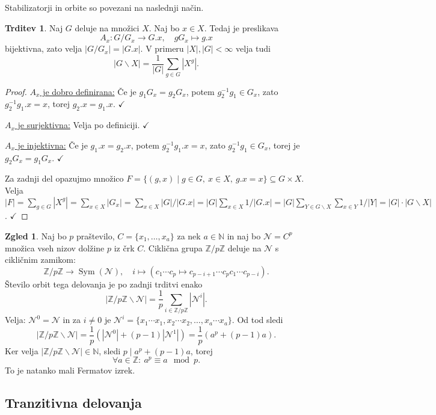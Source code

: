 \documentclass[11pt]{book}
\def\NN{\mathbb{N}}
\def\ZZ{\mathbb{Z}}
\DeclareMathOperator\Sym{Sym}
\def\kljuka{$\checkmark$}
\theoremstyle{definition}
\theoremstyle{zgled}
\newtheorem*{zgled}{Zgled}
\theoremstyle{odprtproblem}
\theoremstyle{domacanaloga}
\newenvironment{dokaz}
    {\color{siva}\begin{proof}}
    {\end{proof}}
\theoremstyle{izrek}
\newtheorem*{trditev}{Trditev}
\begin{document}
Stabilizatorji in orbite so povezani na naslednji način.

\begin{trditev}
Naj $G$ deluje na množici $X$. Naj bo $x \in X$. Tedaj je preslikava
\[
A_x \colon G/G_x \to G.x, \quad g G_x \mapsto g.x
\]
bijektivna, zato velja $|G/G_x| = |G.x|$. V primeru $|X|, |G| < \infty$ velja tudi
\[
|G \backslash X| = \frac{1}{|G|} \sum_{g \in G} |X^g|.
\]
\end{trditev}

\begin{dokaz}
\underline{$A_x$ je dobro definirana:} Če je $g_1 G_x = g_2 G_x$, potem $g_2^{-1} g_1 \in G_x$, zato $g_2^{-1} g_1 .x = x$, torej $g_2.x = g_1.x$. \kljuka

\underline{$A_x$ je surjektivna:} Velja po definiciji. \kljuka

\underline{$A_x$ je injektivna:} Če je $g_1.x = g_2.x$, potem $g_2^{-1}g_1.x=x$, zato $g_2^{-1}g_1 \in G_x$, torej je $g_2G_x = g_1G_x$. \kljuka

Za zadnji del opazujmo množico $F = \{ (g, x) \mid g \in G, \ x \in X,\ g.x = x \} \subseteq G \times X$. Velja $|F| = \sum_{g \in G} |X^g| = \sum_{x \in X} |G_x| = \sum_{x \in X} |G|/|G.x| = |G| \sum_{x \in X} 1/|G.x| = |G| \sum_{Y \in G \backslash X} \sum_{x \in Y} 1/|Y| = |G| \cdot |G \backslash X|$. \kljuka
\end{dokaz}

\begin{zgled}
Naj bo $p$ praštevilo, $C = \{ x_1, \dots, x_a \}$ za nek $a \in \NN$ in naj bo $\mathcal{N} = C^p$ množica vseh nizov dolžine $p$ iz črk $C$. Ciklična grupa $\ZZ/p\ZZ$ deluje na $\mathcal{N}$ s cikličnim zamikom:
\[
\ZZ/p\ZZ \to \Sym(\mathcal{N}), \quad
i \mapsto (c_1 \cdots c_p \mapsto c_{p - i + 1} \cdots c_p c_1 \cdots c_{p-i}).
\]
Število orbit tega delovanja je po zadnji trditvi enako
\[
|\ZZ/p\ZZ \backslash \mathcal{N}| = \frac{1}{p} \sum_{i \in \ZZ/p\ZZ} |\mathcal{N}^i|.
\]
Velja: $\mathcal{N}^0 = \mathcal{N}$ in za $i \neq 0$ je $\mathcal{N}^i = \{ x_1 \cdots x_1, x_2 \cdots x_2, \dots, x_a \cdots x_a \}$. Od tod sledi
\[
|\ZZ/p\ZZ \backslash \mathcal{N}| = \frac{1}{p} (|\mathcal{N}^0| + (p-1)|\mathcal{N}^1|) = \frac{1}{p} (a^p + (p-1)a).
\]
Ker velja $|\ZZ/p\ZZ \backslash \mathcal{N}| \in \NN$, sledi $p \mid a^p + (p-1)a$, torej
\[
\forall a \in \ZZ \colon \ a^p \equiv a \mod{p}.
\]
To je natanko mali Fermatov izrek.
\end{zgled}

\subsection{Tranzitivna delovanja}
\end{document}

